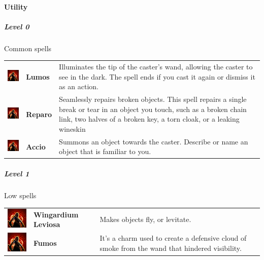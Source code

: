 \paragraph{Utility} 


\subparagraph{Level 0} 
Common spells \\
\begin{tabular}{ m{2cm}m{3cm}m{8cm}} 
  \includegraphics[width=2cm]{../Pictures/Gameplay/Spells/Icon/spell_icon.png} & \textbf{Lumos} & Illuminates the tip of the caster's wand, allowing the caster to see in the dark. The spell ends if you cast it again or dismiss it as an action.\\ 
	\includegraphics[width=2cm]{../Pictures/Gameplay/Spells/Icon/spell_icon.png} & \textbf{Reparo} & Seamlessly repairs broken objects. This spell repairs a single break or tear in an object you touch, such as a broken chain link, two halves of a broken key, a torn cloak, or a leaking wineskin \\ 
	\includegraphics[width=2cm]{../Pictures/Gameplay/Spells/Icon/spell_icon.png} & \textbf{Accio} &  Summons an object towards the caster. Describe or name an object that is familiar to you. \\ 
\end{tabular}

\subparagraph{Level 1} 
 Low  spells\\
\begin{tabular}{ m{2cm}m{3cm}m{8cm} } 
 \includegraphics[width=2cm]{../Pictures/Gameplay/Spells/Icon/spell_icon.png} & \textbf{Wingardium Leviosa} & Makes objects fly, or levitate.   \\ 
	\includegraphics[width=2cm]{../Pictures/Gameplay/Spells/Icon/spell_icon.png} & \textbf{Fumos} & It's a charm used to create a defensive cloud of smoke from the wand that hindered visibility. \\  
\end{tabular}

